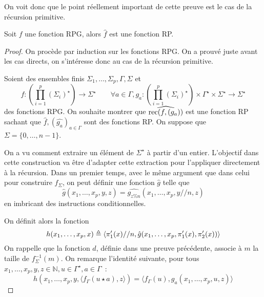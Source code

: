 On voit donc que le point réellement important de cette preuve est le cas de
la récursion primitive.

\begin{lemma}
  Soit $f$ une fonction RPG, alors $\hat f$ est une fonction RP.
\end{lemma}

\begin{proof}
  On procède par induction sur les fonctions RPG. On a prouvé juste avant les
  cas directs, on s'intéresse donc au cas de la récursion primitive.

  Soient des ensembles finis $\Sigma_1,\ldots,\Sigma_p,\Gamma,\Sigma$ et
  \[f : \left(\prod_{i = 1}^p (\Sigma_i)^\star\right)\to \Sigma^\star\qquad
  \forall a \in \Gamma, g_a : \left(\prod_{i = 1}^p
  (\Sigma_i)^\star\right)\times\Gamma^\star\times\Sigma^\star
  \to \Sigma^\star\]
  des fonctions RPG. On souhaite montrer que $\widehat{\operatorname{rec}(f,(g_a))}$ est
  une fonction RP sachant que $\hat f, (\hat{g_a})_{a\in \Gamma}$ sont
  des fonctions RP. On suppose que $\Sigma = \{0,\ldots,n-1\}$.

  On a vu comment extraire un élément de $\Sigma^\star$ à partir d'un
  entier. L'objectif dans cette construction va être d'adapter cette
  extraction pour l'appliquer directement à la récursion. Dans un premier
  temps, avec le même argument que dans celui pour construire $f_\Sigma$,
  on peut définir une fonction $\hat g$ telle que
  \[\hat g (x_1,\ldots,x_p,y,z) = \widehat{g_{z\% n}}(x_1,\ldots,x_p,y//n,z)\]
  en imbricant des instructions conditionnelles.

  On définit alors la fonction
  \[h(x_1,\ldots,x_p,x) \triangleq
  \langle\pi'_1(x) // n,\hat g(x_1,\ldots,x_p,\pi'_1(x),\pi'_2(x))\rangle\]
  On rappelle que la fonction $d$, définie dans une preuve précédente, associe
  à $m$ la taille de $f_\Sigma^{-1}(m)$. On remarque l'identité suivante, pour
  tous $x_1,\ldots,x_p,y,z\in \mathbb N, u \in \Gamma^\star, a \in \Gamma$~:
  \[h(x_1,\ldots,x_p,y,\langle f_\Gamma(u\star a),z\rangle) =
  \langle f_\Gamma(u),g_a(x_1,\ldots,x_p,u,z)\rangle\]


\end{proof}

